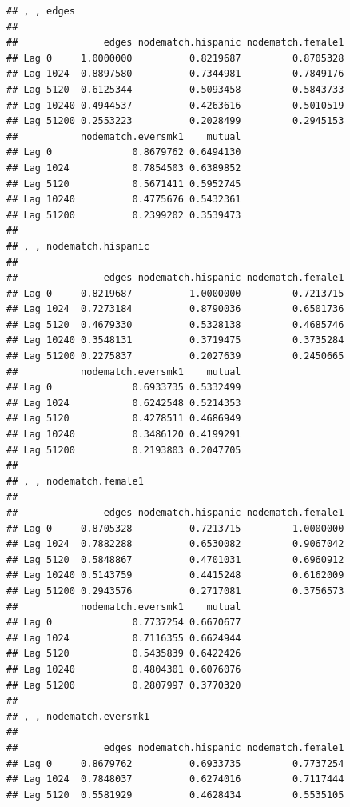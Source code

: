 \documentclass[]{book}
\newenvironment{Shaded}{\begin{snugshade}}{\end{snugshade}}
\newcommand{\KeywordTok}[1]{\textcolor[rgb]{0.13,0.29,0.53}{\textbf{#1}}}
\newcommand{\DecValTok}[1]{\textcolor[rgb]{0.00,0.00,0.81}{#1}}
\newcommand{\OperatorTok}[1]{\textcolor[rgb]{0.81,0.36,0.00}{\textbf{#1}}}
\newcommand{\NormalTok}[1]{#1}
\theoremstyle{definition}
\theoremstyle{definition}
\theoremstyle{definition}
\theoremstyle{remark}
\begin{document}
\begin{enumerate}
\begin{Shaded}
\end{Shaded}

\begin{verbatim}
## , , edges
## 
##               edges nodematch.hispanic nodematch.female1
## Lag 0     1.0000000          0.8219687         0.8705328
## Lag 1024  0.8897580          0.7344981         0.7849176
## Lag 5120  0.6125344          0.5093458         0.5843733
## Lag 10240 0.4944537          0.4263616         0.5010519
## Lag 51200 0.2553223          0.2028499         0.2945153
##           nodematch.eversmk1    mutual
## Lag 0              0.8679762 0.6494130
## Lag 1024           0.7854503 0.6389852
## Lag 5120           0.5671411 0.5952745
## Lag 10240          0.4775676 0.5432361
## Lag 51200          0.2399202 0.3539473
## 
## , , nodematch.hispanic
## 
##               edges nodematch.hispanic nodematch.female1
## Lag 0     0.8219687          1.0000000         0.7213715
## Lag 1024  0.7273184          0.8790036         0.6501736
## Lag 5120  0.4679330          0.5328138         0.4685746
## Lag 10240 0.3548131          0.3719475         0.3735284
## Lag 51200 0.2275837          0.2027639         0.2450665
##           nodematch.eversmk1    mutual
## Lag 0              0.6933735 0.5332499
## Lag 1024           0.6242548 0.5214353
## Lag 5120           0.4278511 0.4686949
## Lag 10240          0.3486120 0.4199291
## Lag 51200          0.2193803 0.2047705
## 
## , , nodematch.female1
## 
##               edges nodematch.hispanic nodematch.female1
## Lag 0     0.8705328          0.7213715         1.0000000
## Lag 1024  0.7882288          0.6530082         0.9067042
## Lag 5120  0.5848867          0.4701031         0.6960912
## Lag 10240 0.5143759          0.4415248         0.6162009
## Lag 51200 0.2943576          0.2717081         0.3756573
##           nodematch.eversmk1    mutual
## Lag 0              0.7737254 0.6670677
## Lag 1024           0.7116355 0.6624944
## Lag 5120           0.5435839 0.6422426
## Lag 10240          0.4804301 0.6076076
## Lag 51200          0.2807997 0.3770320
## 
## , , nodematch.eversmk1
## 
##               edges nodematch.hispanic nodematch.female1
## Lag 0     0.8679762          0.6933735         0.7737254
## Lag 1024  0.7848037          0.6274016         0.7117444
## Lag 5120  0.5581929          0.4628434         0.5535105

\end{verbatim}
\end{enumerate}
\end{document}

